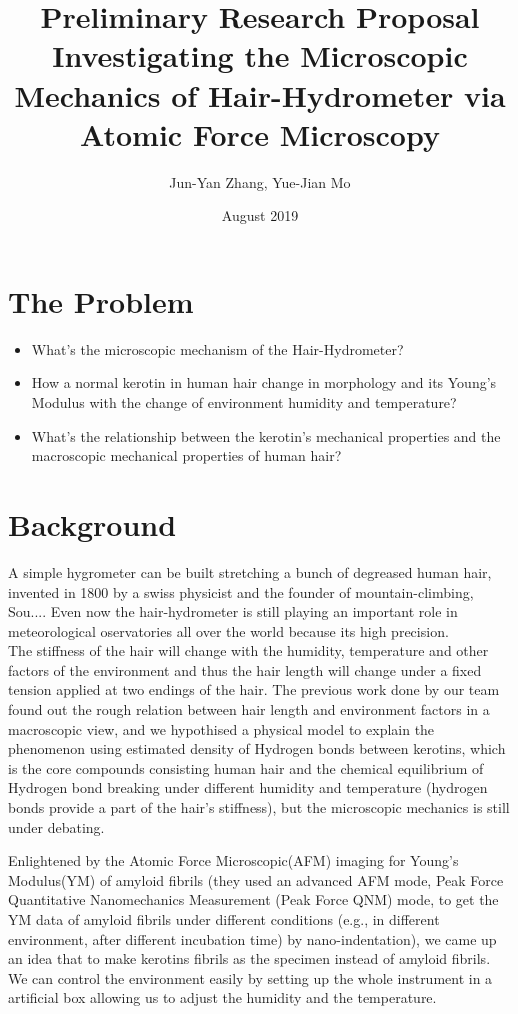 \documentclass{article}
\title{\textbf{Preliminary Research Proposal}\\Investigating the Microscopic Mechanics of Hair-Hydrometer via Atomic Force Microscopy }
\author{Jun-Yan Zhang, Yue-Jian Mo}
\date{August 2019}
\begin{document}
\maketitle

\begin{abstract}
    
\end{abstract}

\section{The Problem}
\begin{itemize}
\item What's the microscopic mechanism of the Hair-Hydrometer?
\item How a normal kerotin in human hair change in morphology and its Young's Modulus with the change of environment humidity and temperature? 
\item What's the relationship between the kerotin's mechanical properties and the macroscopic mechanical properties of human hair?
\end{itemize}

\section{Background}
A simple hygrometer can be built stretching a bunch of degreased human hair, invented in 1800 by a swiss physicist and the founder of mountain-climbing, Sou....  Even now the hair-hydrometer is still playing an important role in meteorological oservatories all over the world because its high precision. \\
The stiffness of the hair will change with the humidity, temperature and other factors of the environment and thus the hair length will change under a fixed tension applied at two endings of the hair. The previous work done by our team found out the rough relation between hair length and environment factors in a macroscopic view, and we hypothised a physical model to explain the phenomenon using estimated density of Hydrogen bonds between kerotins, which is the core compounds consisting human hair and the chemical equilibrium of Hydrogen bond breaking under different humidity and temperature (hydrogen bonds provide a part of the hair's stiffness), but the microscopic mechanics is still under debating.

Enlightened by the Atomic Force Microscopic(AFM) imaging for Young's Modulus(YM) of amyloid fibrils \citep{lee2016advances}(they used an advanced AFM mode, Peak Force Quantitative Nanomechanics Measurement (Peak Force QNM) mode, to get the YM data of amyloid fibrils under different conditions (e.g., in different environment, after different incubation time) by nano-indentation), we came up an idea that to make kerotins fibrils as the specimen instead of amyloid fibrils.  \\
We can control the environment easily by setting up the whole instrument in a artificial box allowing us to adjust the humidity and the temperature.
\end{document}
